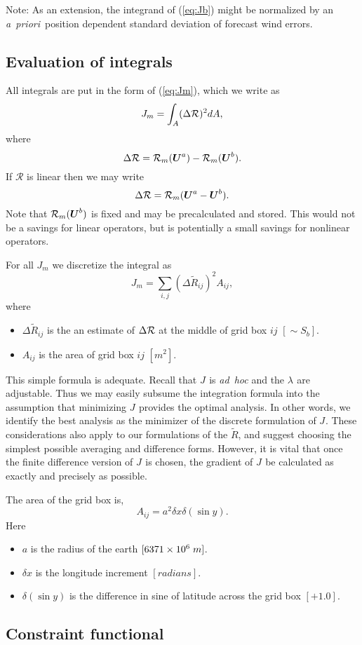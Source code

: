 \documentclass[11pt]{article}
\newcommand{\apriori}{{\em a~priori}}
\newcommand{\gl}[1]{\mbox{$ \lambda_{#1} $}}
\newcommand{\J}[1]{\mbox{$ J_{#1} $}}
\newcommand{\mks}[2]{\mbox{$ {#1} \; {#2} $}}
\newcommand{\Vector}[1]{\mbox{\boldmath ${#1}$}}
\newcommand{\xxx}[1]{\subsection {#1}}
\newcommand{\eql}[2]{\begin{equation} \label{eq:#1} #2 \end{equation}}
\newcommand{\eqr}[1]{(\ref{eq:#1})}
\newcommand{\vardef}[3]{\item $ {#1} $ is the {#2} $ [{#3}] $. }
\renewcommand{\apriori}{{\em a~priori}}
\newcommand{\Operator}[1]{\mbox{$ \mathcal #1 $}}
\begin{document}
Note: As an extension, the integrand of \eqr{Jb} might be normalized
by an \apriori\ position dependent standard deviation of forecast wind
errors.

\xxx {Evaluation of integrals}

All integrals are put in the form of \eqr{Jm}, which we write as
 \eql{Jmdel}{ J_m = \int_A (\Delta \Operator{R})^2 dA , }
 where
 \eql{DR}{ \Delta \Operator{R} = \Operator{R}_m(\Vector{U}^a) -
   \Operator{R}_m(\Vector{U}^b) . }
 If \Operator{R} is linear then we may write
 \eql{DRL}{ \Delta \Operator{R} = \Operator{R}_m(\Vector{U}^a -
   \Vector{U}^b) . }
 Note that $\Operator{R}_m(\Vector{U}^b)$ is fixed and may be
precalculated and stored.  This would not be a savings for linear
operators, but is potentially a small savings for nonlinear operators.

For all \J{m} we discretize the integral as
 \eql{Jmdisc}{ J_m = \sum_{i,j} (\Delta \tilde{R}_{ij})^2 A_{ij} , }
 where \begin{itemize}
  \vardef{\Delta \tilde{R}_{ij}}{an estimate of $\Delta \Operator{R}$
at the middle of grid box $ij$}{\sim S_b}
  \vardef{ A_{ij}}{area of grid box $ij$}{m^2}
 \end{itemize} 
 This simple formula is adequate.  Recall that \J{} is {\em ad~hoc}
and the \gl{} are adjustable.  Thus we may easily subsume the
integration formula into the assumption that minimizing \J{} provides
the optimal analysis.  In other words, we identify the best analysis
as the minimizer of the discrete formulation of \J{}.  These 
considerations also apply to our formulations of the $ \tilde{R} $,
and suggest choosing the simplest possible averaging and difference forms.
However, it is vital that once the finite difference version of \J{}
is chosen, the gradient of \J{} be calculated as exactly and precisely
as possible.

The area of the grid box is,
 \eql{area}{ A_{ij} = a^2 \delta x \delta(\sin y) .}
 Here \begin{itemize}
  \vardef{a}{radius of the earth}{\mks{6371 \times 10^6}{m}}
  \vardef{\delta x}{longitude increment}{radians}
  \vardef{\delta(\sin y)}{difference in sine of latitude across the grid box}{+1.0}
 \end{itemize} 

\xxx {Constraint functional}
\end{document}
